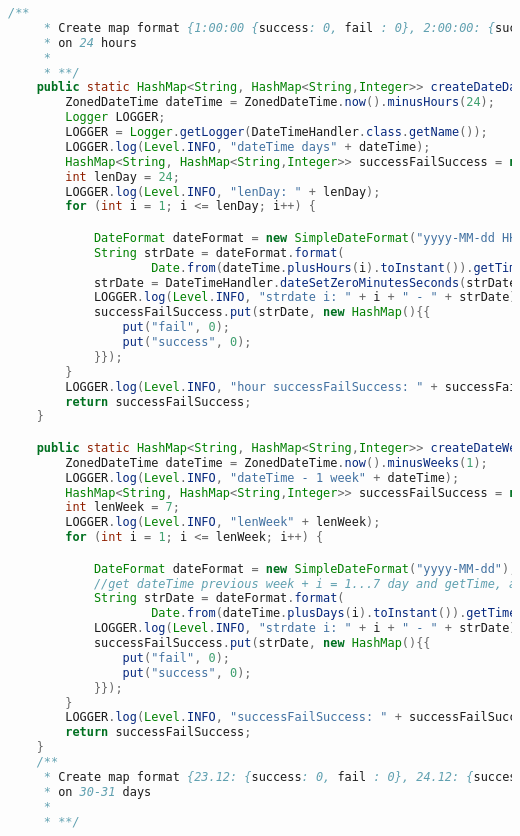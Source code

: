 \begin{lstlisting}[language=Java]
    /**
     * Create map format {1:00:00 {success: 0, fail : 0}, 2:00:00: {success: 0, fail : 0} ...}
     * on 24 hours
     *
     * **/
    public static HashMap<String, HashMap<String,Integer>> createDateDayMapSuccess() throws ParseException {
        ZonedDateTime dateTime = ZonedDateTime.now().minusHours(24);
        Logger LOGGER;
        LOGGER = Logger.getLogger(DateTimeHandler.class.getName());
        LOGGER.log(Level.INFO, "dateTime days" + dateTime);
        HashMap<String, HashMap<String,Integer>> successFailSuccess = new HashMap();
        int lenDay = 24;
        LOGGER.log(Level.INFO, "lenDay: " + lenDay);
        for (int i = 1; i <= lenDay; i++) {

            DateFormat dateFormat = new SimpleDateFormat("yyyy-MM-dd HH:mm:ss");
            String strDate = dateFormat.format(
                    Date.from(dateTime.plusHours(i).toInstant()).getTime());
            strDate = DateTimeHandler.dateSetZeroMinutesSeconds(strDate);
            LOGGER.log(Level.INFO, "strdate i: " + i + " - " + strDate);
            successFailSuccess.put(strDate, new HashMap(){{
                put("fail", 0);
                put("success", 0);
            }});
        }
        LOGGER.log(Level.INFO, "hour successFailSuccess: " + successFailSuccess.entrySet());
        return successFailSuccess;
    }

    public static HashMap<String, HashMap<String,Integer>> createDateWeekMapSuccessRate() {
        ZonedDateTime dateTime = ZonedDateTime.now().minusWeeks(1);
        LOGGER.log(Level.INFO, "dateTime - 1 week" + dateTime);
        HashMap<String, HashMap<String,Integer>> successFailSuccess = new HashMap();
        int lenWeek = 7;
        LOGGER.log(Level.INFO, "lenWeek" + lenWeek);
        for (int i = 1; i <= lenWeek; i++) {

            DateFormat dateFormat = new SimpleDateFormat("yyyy-MM-dd");
            //get dateTime previous week + i = 1...7 day and getTime, after in strDate=2022-03-22
            String strDate = dateFormat.format(
                    Date.from(dateTime.plusDays(i).toInstant()).getTime());
            LOGGER.log(Level.INFO, "strdate i: " + i + " - " + strDate);
            successFailSuccess.put(strDate, new HashMap(){{
                put("fail", 0);
                put("success", 0);
            }});
        }
        LOGGER.log(Level.INFO, "successFailSuccess: " + successFailSuccess.entrySet());
        return successFailSuccess;
    }
    /**
     * Create map format {23.12: {success: 0, fail : 0}, 24.12: {success: 0, fail : 0} ...}
     * on 30-31 days
     *
     * **/


\end{lstlisting}
